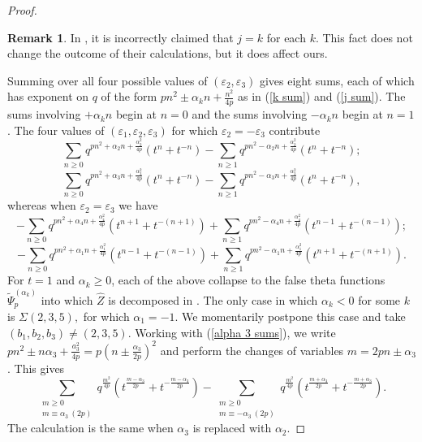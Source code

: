\documentclass[11pt,letterpaper]{amsart}
\theoremstyle{definition}
\newtheorem*{remark}{Remark}
\theoremstyle{plain}
\newcommand{\Zhat}{\widehat{Z}}
\numberwithin{equation}{section}
\theoremstyle{example}
\begin{document}
\begin{proof}
\begin{remark}
In \cite{gukovmanolescu}, it is incorrectly claimed that $j=k$ for each $k$. This fact does not change the outcome of their calculations, but it does affect ours.
\end{remark} Summing over all four possible values of $(\varepsilon_{2},\varepsilon_{3})$ gives eight sums, each of which has exponent on $q$ of the form $pn^{2} \pm\alpha_{k}n+\frac{n^{2}}{4p}$ as in (\ref{k sum}) and (\ref{j sum}). The sums involving $+\alpha_{k}n$ begin at $n=0$ and the sums involving $-\alpha_{k}n$ begin at $n=1$. The four values of $(\varepsilon_{1},\varepsilon_{2},\varepsilon_{3})$ for which $\varepsilon_{2}=-\varepsilon_{3}$ contribute \[\sum_{n \geq 0}q^{pn^{2}+\alpha_{2}n+\frac{\alpha_{2}^{2}}{4p}}(t^n+t^{-n})-\sum_{n\geq 1}q^{pn^{2}-\alpha_{2}n+\frac{\alpha_{2}^{2}}{4p}}(t^n+t^{-n});\] \begin{equation}\label{alpha 3 sums} \sum_{n \geq 0}q^{pn^{2}+\alpha_{3}n+\frac{\alpha_{3}^{2}}{4p}}(t^n+t^{-n})-\sum_{n\geq 1}q^{pn^{2}-\alpha_{3}n+\frac{\alpha_{3}^{2}}{4p}}(t^n+t^{-n}),\end{equation} whereas when $\varepsilon_{2}=\varepsilon_{3}$ we have \[-\sum_{n \geq 0}q^{pn^{2}+\alpha_{4}n+\frac{\alpha_{4}^{2}}{4p}}(t^{n+1}+t^{-(n+1)})+\sum_{n\geq 1}q^{pn^{2}-\alpha_{4}n+\frac{\alpha_{4}^{2}}{4p}}(t^{n-1}+t^{-(n-1)});\] \begin{equation}\label{eqn:alpha1}-\sum_{n \geq 0}q^{pn^{2}+\alpha_{1}n+\frac{\alpha_{1}^{2}}{4p}}(t^{n-1}+t^{-(n-1)})+\sum_{n\geq 1}q^{pn^{2}-\alpha_{1}n+\frac{\alpha_{1}^{2}}{4p}}(t^{n+1}+t^{-(n+1)}).\end{equation} For $t=1$ and $\alpha_{k} \geq 0$, each of the above collapse to the false theta functions $\tilde{\Psi}^{(\alpha_{k})}_{p}$ into which $\Zhat$ is decomposed in \cite{gukovmanolescu}. The only case in which $\alpha_k < 0$ for some $k$ is $\Sigma(2,3,5),$ for which $\alpha_{1}=-1$. 
We momentarily postpone this case and take $(b_{1},b_{2},b_{3})\neq(2,3,5)$. Working with (\ref{alpha 3 sums}), we write $pn^2\pm n\alpha_3 +\frac{a_3^2}{4p} = p(n\pm\frac{\alpha_3}{2p})^2$ and perform the changes of variables $m = 2pn \pm \alpha_3$. This gives 
\[\sum_{\substack{m \geq 0 \\ m \equiv \alpha_3 \ (2p)}} q^{\frac{m^2}{4p}}(t^{\frac{m-\alpha_3}{2p}}+t^{-\frac{m-\alpha_3}{2p}}) -\sum_{\substack{m \geq 0 \\ m \equiv - \alpha_3 \ (2p)}} q^{\frac{m^2}{4p}}(t^{\frac{m+\alpha_3}{2p}}+t^{-\frac{m+\alpha_3}{2p}}).
\]
The calculation is the same when $\alpha_3$ is replaced with $\alpha_2$.

\end{proof}
\end{document}
